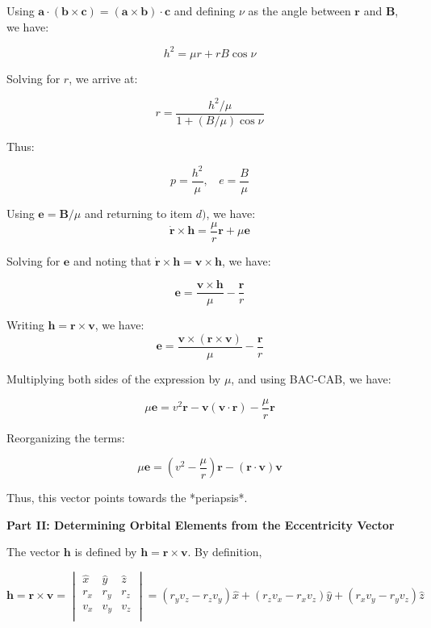 \documentclass[11pt]{article}
\begin{document}
\begin{pproblem}
\begin{pssolution*}{}{}
\begin{alternativas}
        Using $\mathbf{a}\cdot(\mathbf{b}\times \mathbf{c}) = (\mathbf{a}\times \mathbf{b})\cdot \mathbf{c}$ and defining $\nu$ as the angle between $\mathbf{r}$ and $\mathbf{B}$, we have:

        \[h^2 = \mu r + rB\cos\nu\]

        Solving for $r$, we arrive at:

        \[r = \frac{h^2/\mu}{1+(B/\mu)\cos\nu}\]

        Thus:

        \[\boxed{p = \frac{h^2}{\mu}, \ \ \ \ e = \frac{B}{\mu}}\]

        \item Using $\mathbf{e} = \mathbf{B}/\mu$ and returning to item $d)$, we have:
        \[\dot{\mathbf{r}}\times \mathbf{h} = \frac{\mu}{r}\mathbf{r}+\mu \mathbf{e}\]

        Solving for $\mathbf{e}$ and noting that $\dot{\mathbf{r}}\times\mathbf{h} = \mathbf{v}\times\mathbf{h}$, we have:

        \[\boxed{\mathbf{e} = \frac{\mathbf{v}\times\mathbf{h}}{\mu} - \frac{\mathbf{r}}{r}}\]

        \item Writing $\mathbf{h} = \mathbf{r}\times\mathbf{v}$, we have:
        \[\mathbf{e} = \frac{\mathbf{v}\times(\mathbf{r}\times\mathbf{v})}{\mu} - \frac{\mathbf{r}}{r} \]

        Multiplying both sides of the expression by $\mu$, and using BAC-CAB, we have:

        \[\mu\mathbf{e} = v^2\mathbf{r} - \mathbf{v}(\mathbf{v}\cdot\mathbf{r}) - \frac{\mu}{r}\mathbf{r}\]

        Reorganizing the terms:

        \[\boxed{\mu \mathbf{e} = (v^2-\frac{\mu}{r})\mathbf{r} - (\mathbf{r}\cdot\mathbf{v})\mathbf{v}}\]

        Thus, this vector points towards the *periapsis*.
    \end{alternativas}
    \begin{center}
        \textbf{Part II: Determining Orbital Elements from the Eccentricity Vector}     
    \end{center}
    \begin{alternativas}
        \item The vector $\mathbf{h}$ is defined by $\mathbf{h} = \mathbf{r}\times\mathbf{v}$. By definition,
        
        $$\mathbf{h}=\mathbf{r}\times\mathbf{v} = 
        \begin{vmatrix}
            \hat{x} & \hat{y} & \hat{z} \\
            r_x & r_y & r_z \\
            v_x & v_y & v_z \\
        \end{vmatrix}
        = (r_yv_z - r_zv_y)\hat{x} + (r_zv_x-r_xv_z)\hat{y} + (r_xv_y-r_yv_z)\hat{z}   $$


\end{alternativas}
\end{pssolution*}
\end{pproblem}
\end{document}
